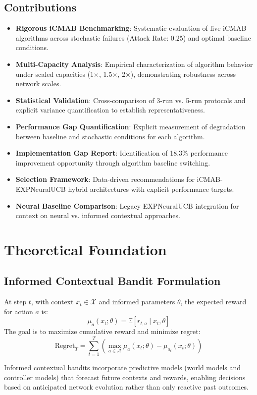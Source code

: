 \documentclass[12pt,a4paper]{article}
\begin{document}
\subsection{Contributions}
\begin{itemize}
\item \textbf{Rigorous iCMAB Benchmarking}: Systematic evaluation of five iCMAB algorithms across stochastic failures (Attack Rate: 0.25) and optimal baseline conditions.
\item \textbf{Multi-Capacity Analysis}: Empirical characterization of algorithm behavior under scaled capacities (1$\times$, 1.5$\times$, 2$\times$), demonstrating robustness across network scales.
\item \textbf{Statistical Validation}: Cross-comparison of 3-run vs. 5-run protocols and explicit variance quantification to establish representativeness.
\item \textbf{Performance Gap Quantification}: Explicit measurement of degradation between baseline and stochastic conditions for each algorithm.
\item \textbf{Implementation Gap Report}: Identification of 18.3\% performance improvement opportunity through algorithm baseline switching.
\item \textbf{Selection Framework}: Data-driven recommendations for iCMAB-EXPNeuralUCB hybrid architectures with explicit performance targets.
\item \textbf{Neural Baseline Comparison}: Legacy EXPNeuralUCB integration for context on neural vs. informed contextual approaches.
\end{itemize}

\section{Theoretical Foundation}

\subsection{Informed Contextual Bandit Formulation}
At step $t$, with context $x_t \in \mathcal{X}$ and informed parameters $\theta$, the expected reward for action $a$ is:
\[
\mu_a(x_t; \theta) = \mathbb{E}[r_{t,a} \mid x_t, \theta]
\]
The goal is to maximize cumulative reward and minimize regret:
\[
\mathrm{Regret}_T = \sum_{t=1}^{T}\left(\max_{a \in \mathcal{A}} \mu_a(x_t;\theta) - \mu_{a_t}(x_t;\theta)\right)
\]

Informed contextual bandits incorporate predictive models (world models and controller models) that forecast future contexts and rewards, enabling decisions based on anticipated network evolution rather than only reactive past outcomes.
\end{document}
